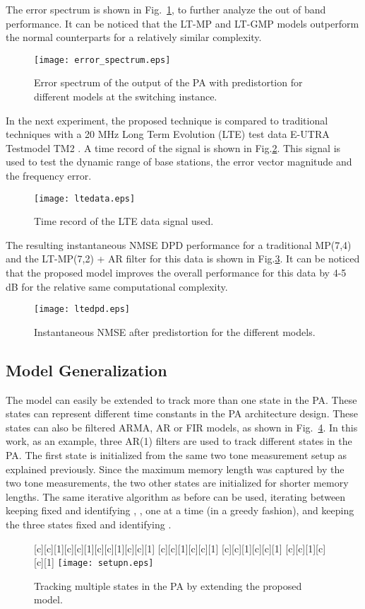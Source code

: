 \documentclass[journal]{IEEEtran}
\begin{document}
The error spectrum is shown in Fig.~\ref{error_spectrum}, to further analyze the out of band performance. It can be noticed that the LT-MP and LT-GMP models outperform the normal counterparts for a relatively similar complexity.
\begin{figure}
\centering
\texttt{[image: error\_spectrum.eps]}
\caption{Error spectrum of the output of the PA with predistortion for different models at the switching instance.} \label{error_spectrum}
\end{figure}

In the next experiment, the proposed technique is compared to traditional techniques with a 20 MHz 
Long Term Evolution (LTE) test data E-UTRA Testmodel TM2 \cite{3gpp}. A time record of the signal is shown in
Fig.\ref{ltedata}. This signal is used to test the dynamic range of base stations, the error vector magnitude 
and the frequency error.
\begin{figure}
\centering
\texttt{[image: ltedata.eps]}
\caption{Time record of the LTE data signal used.} \label{ltedata}
\end{figure}

The resulting instantaneous NMSE DPD performance for a traditional MP(7,4) and the LT-MP(7,2) + AR filter for 
this data is shown in Fig.\ref{ltedpd}. It can be noticed that the proposed model improves the overall performance
for this data by 4-5 dB for the relative same computational complexity.

\begin{figure}
\centering
\texttt{[image: ltedpd.eps]}
\caption{Instantaneous NMSE after predistortion for the different models.} \label{ltedpd}
\end{figure}

\subsection{Model Generalization}
The model can easily be extended to track more than one state in the PA. These states can represent different time constants in the PA architecture design. These states can also be filtered ARMA, AR or FIR models, as shown in Fig.~\ref{setup2}. In this work, as an example, three AR(1) filters are used to track different states in the PA. The first state is initialized from the same two tone measurement setup as explained previously. Since the maximum memory length was captured by the two tone measurements, the two other states are initialized for shorter memory lengths. The same iterative algorithm as before can be used, iterating between keeping  fixed and identifying , ,  one at a time (in a greedy fashion), and keeping the three states fixed and identifying . \begin{figure}
\centering
{}[c][c][1]{}[c][c][1]{}[c][c][1]{}[c][c][1]{}
[c][c][1]{}[c][c][1]{}
[c][c][1]{}[c][c][1]{}
[c][c][1]{}[c][c][1]{}
\texttt{[image: setupn.eps]}
\caption{Tracking multiple states in the PA by extending the proposed model.} \label{setup2}
\end{figure}
\end{document}
